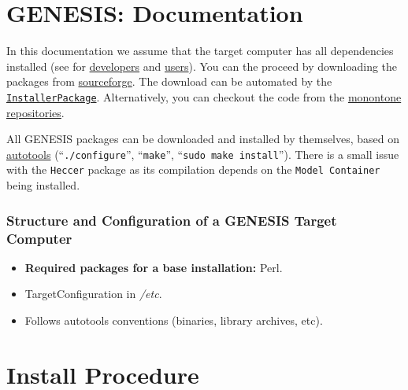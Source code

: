 \documentclass[12pt]{article}
\begin{document}
\section*{GENESIS: Documentation}

In this documentation we assume that the target computer has all dependencies installed (see for \href{../installation-developer/installation-developer.tex}{developers} and \href{../installation-user/installation-user.tex}{users}). You can the proceed by downloading the packages from \href{http://sourceforge.net/project/showfiles.php?group_id=162899}{sourceforge}. The download can be automated by the \href{../installer-package/installer-package.tex}{\tt InstallerPackage}. Alternatively, you can checkout the code from the \href{http://monotone.ca/}{monontone} \href{../developers-intro/developers-intro.tex}{repositories}.

All GENESIS packages can be downloaded and installed by themselves, based on \href{http://www.gnu.org/software/autoconf/}{autotools} (``{\tt ./configure}'', ``{\tt make}'', ``{\tt sudo make install}''). There is a small issue with the {\tt Heccer} package as its compilation depends on the {\tt Model Container} being installed.

\subsubsection*{Structure and Configuration of a GENESIS Target Computer}

\begin{itemize}
\item {\bf Required packages for a base installation:} Perl.
\item TargetConfiguration in {\it /etc}.
\item Follows autotools conventions (binaries, library archives, etc). 
\end{itemize}

\section*{Install Procedure}
\end{document}
